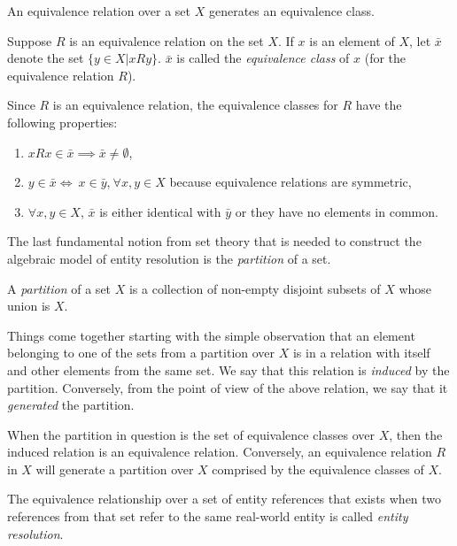 An equivalence relation over a set $X$ generates an equivalence class.

\begin{defn}Suppose $R$ is an equivalence relation on the set $X$.
If $x$ is an element of $X$, let $\bar{x}$ denote the set
$\{y \in X | xRy\}$.
$\bar{x}$ is called the \textit{equivalence class} of $x$ (for the
equivalence relation $R$)\cite{hoffman1971linear}.
\end{defn}

Since $R$ is an equivalence relation, the equivalence classes for $R$ have the
following properties\cite{hoffman1971linear}:
\begin{enumerate}
    \item $xRx \in \bar{x} \implies \bar{x} \neq \emptyset$,
    \item $y\in\bar{x}\iff~x\in\bar{y}$,$~\forall x,y \in X$ because
    equivalence relations are symmetric,
    \item $\forall x,y \in X$, $\bar{x}$ is either identical with $\bar{y}$
    or they have no elements in common\cite{hoffman1971linear,Tal11}.
\end{enumerate}

The last fundamental notion from set theory that is needed to construct the
algebraic model of entity resolution is the \textit{partition} of a set.

\begin{defn}
    A \textit{partition} of a set $X$ is a collection of non-empty disjoint
    subsets of $X$ whose union is $X$\cite{halmos1960naive,Tal11}.
\end{defn}

Things come together starting with the simple observation that an element
belonging to one of the sets from a partition over $X$ is in a relation with
itself and other elements from the same set.
We say that this relation is \textit{induced} by the partition.
Conversely, from the point of view of the above relation, we say that it
\textit{generated} the partition.

When the partition in question is the set of equivalence classes over $X$,
then the induced relation is an equivalence relation.
Conversely, an equivalence relation $R$ in $X$ will generate a partition
over $X$ comprised by the equivalence classes of $X$\cite{halmos1960naive,
Tal11}.

\begin{defn}
    The equivalence relationship over a set of entity references that exists
    when two references from that set refer to the same real-world entity is
    called \textit{entity resolution}.
\end{defn}

